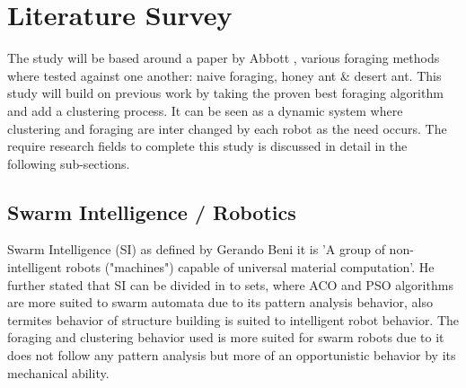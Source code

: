 \documentclass[12pt]{article}
\begin{document}
\section{Literature Survey}
\par{The study will be based around a paper by Abbott \cite{Jade-2014}, various foraging methods where tested against one another: naive foraging, honey ant \& desert ant. This study will build on previous work by taking the proven best foraging algorithm and add a clustering process. It can be seen as a dynamic system where clustering and foraging are inter changed by each robot as the need occurs. The require research fields to complete this study is discussed in detail in the following sub-sections.}

\subsection{Swarm Intelligence / Robotics}
\par{Swarm Intelligence (SI) as defined by Gerando Beni \cite{Beni-Robot} it is 'A group of non-intelligent robots ("machines") capable of universal material computation'. He further stated that SI can be divided in to sets, where ACO and PSO algorithms are more suited to swarm automata due to its pattern analysis behavior, also termites behavior of structure building is suited to intelligent robot behavior. The foraging and clustering behavior used is more suited for swarm robots due to it does not follow any pattern analysis but more of an opportunistic behavior by its mechanical ability.}
\\
\end{document}
